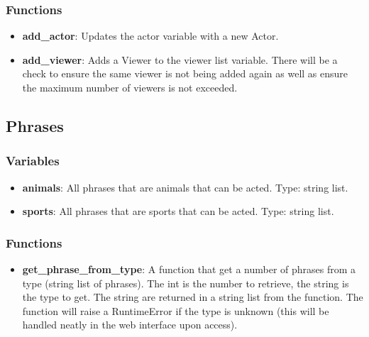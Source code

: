 \documentclass{article}
\begin{document}
\subsubsection{Functions}
\begin{itemize}

	\item \textbf{add\_actor}: Updates the actor variable with a new Actor.
	
	\item \textbf{add\_viewer}: Adds a Viewer to the viewer list variable. There will be a check to ensure the same viewer is not being added again as well as ensure the maximum number of viewers is not exceeded.
	
\end{itemize}

\subsection{Phrases}
\subsubsection{Variables}
\begin{itemize}

	\item \textbf{animals}: All phrases that are animals that can be acted. Type: string list.
	
	\item \textbf{sports}: All phrases that are sports that can be acted. Type: string list.
	
\end{itemize}

\subsubsection{Functions}
\begin{itemize}
	
	\item \textbf{get\_phrase\_from\_type}: A function that get a number of phrases from a type (string list of phrases). The int is the number to retrieve, the string is the type to get. The string are returned in a string list from the function. The function will raise a RuntimeError if the type is unknown (this will be handled neatly in the web interface upon access).
	
\end{itemize}
\end{document}
